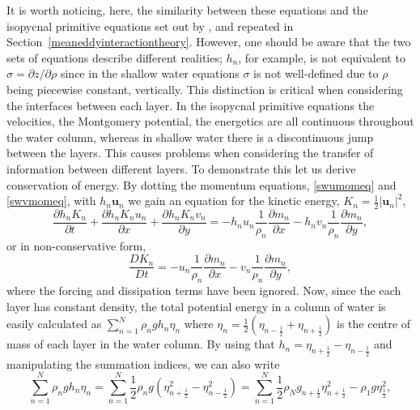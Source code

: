 \documentclass[12pt,a4paper]{report}
\newcommand*\secref[1]{Section~\ref{#1}}
\newcommand*{\half}{\frac{1}{2}}
\begin{document}
   It is worth noticing, here, the similarity between these equations and the isopycnal
    primitive    equations set out by \cite{young2012exact}, and repeated in  \secref{meaneddyinteractiontheory}. However, one should be aware that
    the two sets of equations describe different realities; $h_{n}$, for example, is not
    equivalent to $\sigma = {\partial z}/{\partial \rho}$ since in the shallow water
    equations $\sigma$ is not well-defined due to  $\rho$ being
    piecewise constant, vertically. This distinction is critical when considering the interfaces between each
    layer. In the isopycnal primitive equations the velocities, the Montgomery potential, 
    the energetics are all continuous throughout the water column, whereas in shallow 
    water there is a discontinuous jump between the layers. This causes problems when
    considering the transfer of information between different layers. To demonstrate this
    let us derive conservation of energy. By dotting the momentum equations, \ref{swumomeq}
    and \ref{swvmomeq}, with $h_{n}\boldsymbol{u}_{n}$ we gain an equation for the kinetic 
    energy, $K_{n}=\half \left|\boldsymbol{u}_{n}\right|^{2}$,
    \begin{equation}
    \label{swkeeq}
    \frac{\partial h_{n} K_{n}}{\partial t} + \frac{\partial h_{n} K_{n} u_{n}}{\partial x}+
    \frac{\partial h_{n} K_{n} v_{n} }{\partial y} = - h_{n} u_{n}\frac{1}{\rho_{n}}   \frac{\partial m_{n}}{\partial x} - h_{n} v_{n}\frac{1}{\rho_{n}}   \frac{\partial m_{n}}{\partial y},
    \end{equation}
    or in non-conservative form, 
    \begin{equation}
    \frac{D  K_{n}}{D t}  = - u_{n}\frac{1}{\rho_{n}}   \frac{\partial m_{n}}{\partial x} - v_{n}\frac{1}{\rho_{n}}   \frac{\partial m_{n}}{\partial y},
    \end{equation}
    where the forcing and dissipation terms have been ignored. Now, since the
    each layer has constant density, the total potential energy in a column
    of water is easily calculated as $\sum_{n=1}^{N} \rho_{n} g h_{n}\eta_{n}$ where
    $\eta_{n}=\half  \left(\eta_{n-\half }+\eta_{n+\half }\right)$ is
    the centre of mass of each layer in the water column. By using that $h_{n} = \eta_{n+\half }-\eta_{n-\half }$ and manipulating the summation
    indices, we can also write
    \begin{equation*}
    \sum_{n=1}^{N} \rho_{n} g h_{n}\eta_{n} =
        \sum_{n=1}^{N}\half  \rho_{n} g \left(\eta_{n+\half }^{2}-\eta_{n-\half }^{2}\right) =
        \sum_{n=1}^{N}\half  \rho_{N} g_{n+\half } \eta_{n+\half }^{2}-\rho_{1}g\eta_{\half }^{2},
    \end{equation*} 
\end{document}
